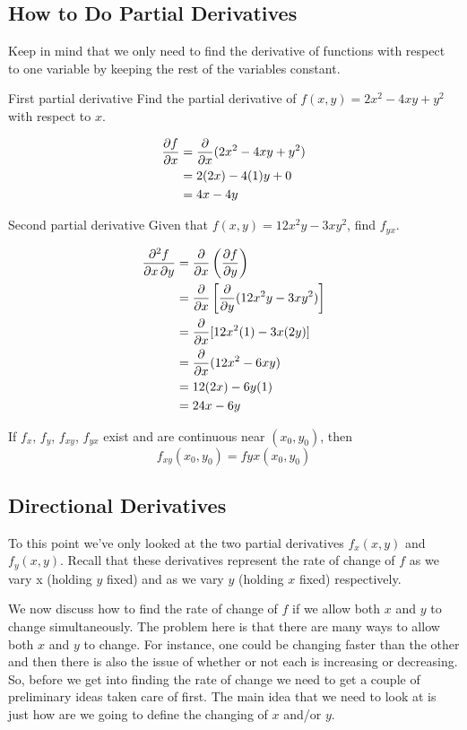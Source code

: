 \subsection{How to Do Partial Derivatives}
Keep in mind that we only need to find the derivative of functions with respect to one variable by keeping the rest of the variables constant.

\begin{exmp}{First partial derivative}{}
Find the partial derivative of $f(x,y)=2x^2-4xy+y^2$ with respect to $x$.
\end{exmp}
\begin{solution}
\begin{align*}
\pdv{f}{x}
&= \pdv{}{x}(2x^2-4xy+y^2) \\
&= 2(2x) - 4(1)y + 0\\
&= 4x - 4y 
\end{align*}
\end{solution}

\begin{exmp}{Second partial derivative}{}
Given that $f(x,y)=12x^2y-3xy^2$, find $f_{yx}$.
\end{exmp}
\begin{solution}
\begin{align*}
\pdv{f}{x,y}
&= \pdv{}{x} \left(\pdv{f}{y}\right) \\
&= \pdv{}{x} \left[\pdv{}{y} (12x^2y - 3xy^2)\right] \\
&= \pdv{}{x}[12x^2(1) - 3x(2y)]\\
&= \pdv{}{x}(12x^2-6xy) \\
&= 12(2x)-6y(1) \\
&= 24x-6y
\end{align*}
\end{solution}

\begin{thrm}{}{}
If $f_x$, $f_y$, $f_{xy}$, $f_{yx}$ exist and are continuous near $(x_0, y_0)$, then
\[ f_{xy}(x_0, y_0) = fyx(x_0, y_0) \]
\end{thrm}

\subsection{Directional Derivatives}
To this point we've only looked at the two partial derivatives $f_x(x,y)$ and $f_y(x,y)$. Recall that these derivatives represent the rate of change of $f$ as we vary x (holding $y$ fixed) and as we vary $y$ (holding $x$ fixed) respectively. 

We now discuss how to find the rate of change of $f$ if we allow both $x$ and $y$ to change simultaneously. The problem here is that there are many ways to allow both $x$ and $y$ to change. For instance, one could be changing faster than the other and then there is also the issue of whether or not each is increasing or decreasing. So, before we get into finding the rate of change we need to get a couple of preliminary ideas taken care of first. The main idea that we need to look at is just how are we going to define the changing of $x$ and/or $y$.

